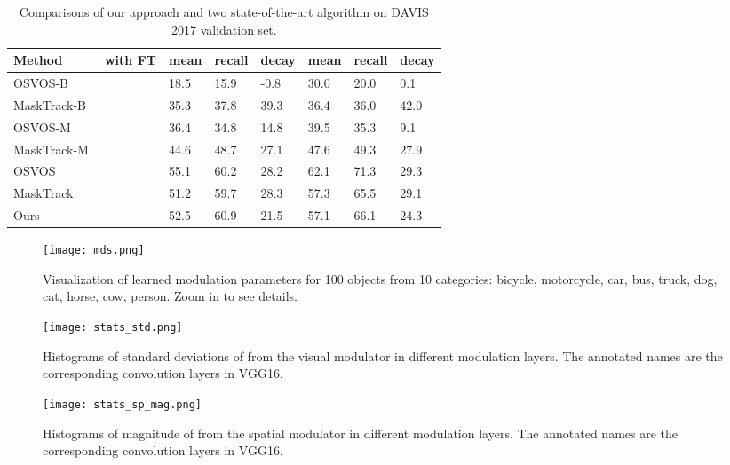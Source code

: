 \documentclass[10pt,twocolumn,letterpaper]{article}
\newcommand{\cmark}{\ding{51}}\newcommand{\xmark}{\ding{55}}
\begin{document}
\begin{table*}[t]
\centering
\caption{Comparisons of our approach and two state-of-the-art algorithm on DAVIS 2017 validation set.}
\label{tab:res_2017}
\begin{tabular}{|l|l|l|l|l|l|l|l|}
\hline
Method      & with FT &  mean &  recall &  decay &  mean &   recall &   decay \\ \hline
OSVOS-B~\cite{Caelles2017osvos}       & \xmark  & 18.5   & 15.9     & -0.8    & 30.0   & 20.0     & 0.1     \\ \hline
MaskTrack-B~\cite{Perazzi2017masktrack}   & \xmark  & 35.3   & 37.8     & 39.3    & 36.4   & 36.0     & 42.0    \\ \hline
OSVOS-M     & \xmark  & 36.4    & 34.8    &14.8    & 39.5     & 35.3     & 9.1    \\ \hline
MaskTrack-M & \xmark  & 44.6   & 48.7      & 27.1     & 47.6   & 49.3     & 27.9     \\ \hline
OSVOS~\cite{Caelles2017osvos}        & \cmark  & 55.1   & 60.2     & 28.2    & 62.1   & 71.3     & 29.3    \\ \hline
MaskTrack~\cite{Perazzi2017masktrack}   & \cmark  & 51.2   & 59.7     & 28.3    & 57.3   & 65.5     & 29.1    \\ \hline
Ours        & \xmark  & 52.5   & 60.9     & 21.5    & 57.1   & 66.1     & 24.3    \\ \hline
\end{tabular}
\end{table*}

\begin{figure}[t]\centering
\texttt{[image: mds.png]}
\caption{Visualization of learned modulation parameters for 100 objects from 10 categories: bicycle, motorcycle, car, bus, truck, dog, cat, horse, cow, person. Zoom in to see details.}
\label{fig:visual}\vspace{-2pt}
\end{figure}

\begin{figure}[t]\centering
\texttt{[image: stats\_std.png]}
\caption{Histograms of standard deviations of  from the visual modulator in different modulation layers. The annotated names are the corresponding convolution layers in VGG16.}
\label{fig:std_vis}\vspace{-2pt}
\end{figure}

\begin{figure}[t]\centering
\texttt{[image: stats\_sp\_mag.png]}
\caption{Histograms of magnitude of  from the spatial modulator in different modulation layers. The annotated names are the corresponding convolution layers in VGG16.}
\label{fig:mag_sp}\vspace{-2pt}
\end{figure}
\end{document}
